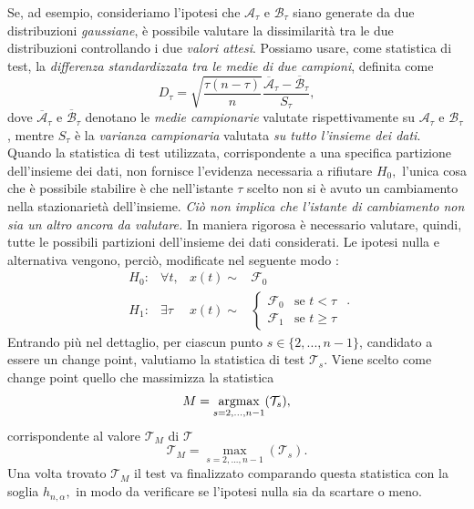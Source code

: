 Se, ad esempio, consideriamo l'ipotesi che $
\mathcal{A}_\tau $
e $ \mathcal{B}_\tau $ siano generate da due
distribuzioni \textit{gaussiane}, \`e
possibile valutare la dissimilarit\`a tra le
due distribuzioni controllando i due
\textit{valori attesi}. Possiamo usare, come
statistica di test, la \textit{differenza
	standardizzata tra le medie di due
	campioni}, definita come
\[ D_\tau = \sqrt{\frac{\tau(n-\tau)}{n}}
\frac{\overline{\mathcal{A}}_\tau-\overline{\mathcal{B}}_\tau}{S_\tau}, \]
dove $ \overline{\mathcal{A}}_\tau $ e $ \overline{\mathcal{B}}_\tau $ denotano le \textit{medie campionarie} valutate rispettivamente su $ \mathcal{A}_\tau $ e $ \mathcal{B}_\tau $, mentre $ S_\tau $ \`e la \textit{varianza campionaria} valutata \textit{su tutto l'insieme dei dati}.\\
Quando la statistica di test utilizzata,
corrispondente a una specifica partizione
dell'insieme dei dati, non fornisce l'evidenza
necessaria a rifiutare $ H_0, $ l'unica cosa
che \`e possibile stabilire \`e che
nell'istante $ \tau $ scelto non si \`e avuto
un cambiamento nella stazionariet\`a
dell'insieme. \textit{Ci\`o non implica che	l'istante di cambiamento non sia un altro ancora da valutare.} 
In maniera rigorosa \`e necessario valutare, quindi, tutte le possibili partizioni dell'insieme dei dati considerati. 
Le ipotesi nulla e alternativa vengono, perci\`o, modificate nel seguente modo \cite{ross2011nonparametric}:
\[
\begin{array}{rccl}
H_0 :& \forall t, & x(t) \sim & \mathcal{F}_0 \\
H_1 :& \exists \tau & x(t) \sim &
\begin{cases}
\mathcal{F}_{0} & \text{se } t < \tau \\
\mathcal{F}_{1} & \text{se } t
\geq \tau
\end{cases}
\end{array}.
\]
Entrando pi\`u nel dettaglio, per ciascun
punto $ s \in \{2,...,n-1\} $, candidato a
essere un change point, valutiamo la
statistica di test $ \mathcal{T}_s. $ Viene scelto come
change point quello che massimizza la
statistica
\[ M= \operatorname*{argmax}_{s=2,...,n-1} (\mathcal{T}_s), \]
corrispondente al valore $ \mathcal{T}_M $ di $\mathcal{T}$
\[ \mathcal{T}_M = \max_{s=2,...,n-1} (\mathcal{T}_s).\]
Una volta trovato $\mathcal{T}_M$ il test va finalizzato
comparando questa statistica con la soglia
$ h_{n,\alpha}, $ in modo da verificare se
l'ipotesi nulla sia da scartare o meno.
